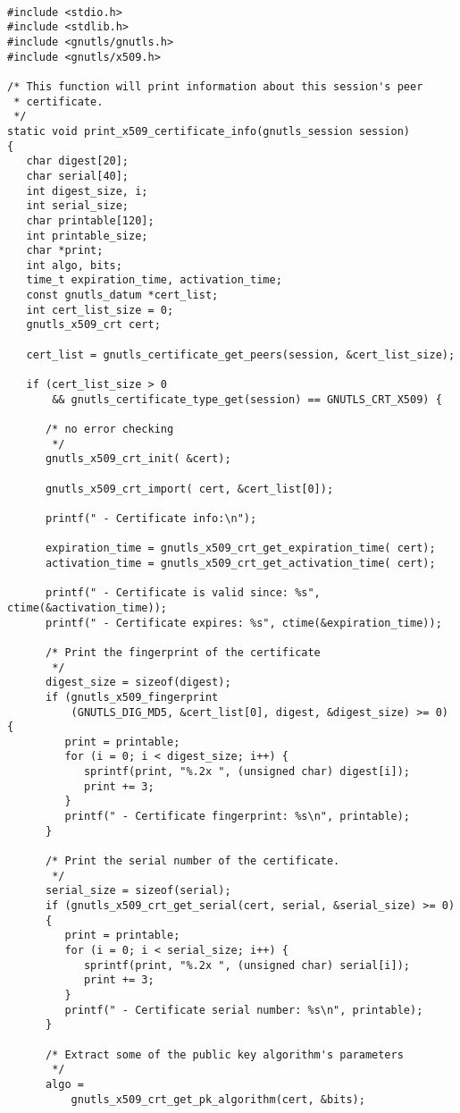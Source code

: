 \begin{verbatim}

#include <stdio.h>
#include <stdlib.h>
#include <gnutls/gnutls.h>
#include <gnutls/x509.h>

/* This function will print information about this session's peer
 * certificate. 
 */
static void print_x509_certificate_info(gnutls_session session)
{
   char digest[20];
   char serial[40];
   int digest_size, i;
   int serial_size;
   char printable[120];
   int printable_size;
   char *print;
   int algo, bits;
   time_t expiration_time, activation_time;
   const gnutls_datum *cert_list;
   int cert_list_size = 0;
   gnutls_x509_crt cert;

   cert_list = gnutls_certificate_get_peers(session, &cert_list_size);

   if (cert_list_size > 0
       && gnutls_certificate_type_get(session) == GNUTLS_CRT_X509) {

      /* no error checking
       */
      gnutls_x509_crt_init( &cert);

      gnutls_x509_crt_import( cert, &cert_list[0]);

      printf(" - Certificate info:\n");

      expiration_time = gnutls_x509_crt_get_expiration_time( cert);
      activation_time = gnutls_x509_crt_get_activation_time( cert);

      printf(" - Certificate is valid since: %s", ctime(&activation_time));
      printf(" - Certificate expires: %s", ctime(&expiration_time));

      /* Print the fingerprint of the certificate
       */
      digest_size = sizeof(digest);
      if (gnutls_x509_fingerprint
          (GNUTLS_DIG_MD5, &cert_list[0], digest, &digest_size) >= 0) {
         print = printable;
         for (i = 0; i < digest_size; i++) {
            sprintf(print, "%.2x ", (unsigned char) digest[i]);
            print += 3;
         }
         printf(" - Certificate fingerprint: %s\n", printable);
      }

      /* Print the serial number of the certificate.
       */
      serial_size = sizeof(serial);
      if (gnutls_x509_crt_get_serial(cert, serial, &serial_size) >= 0) 
      {
         print = printable;
         for (i = 0; i < serial_size; i++) {
            sprintf(print, "%.2x ", (unsigned char) serial[i]);
            print += 3;
         }
         printf(" - Certificate serial number: %s\n", printable);
      }

      /* Extract some of the public key algorithm's parameters
       */
      algo =
          gnutls_x509_crt_get_pk_algorithm(cert, &bits);


\end{verbatim}
